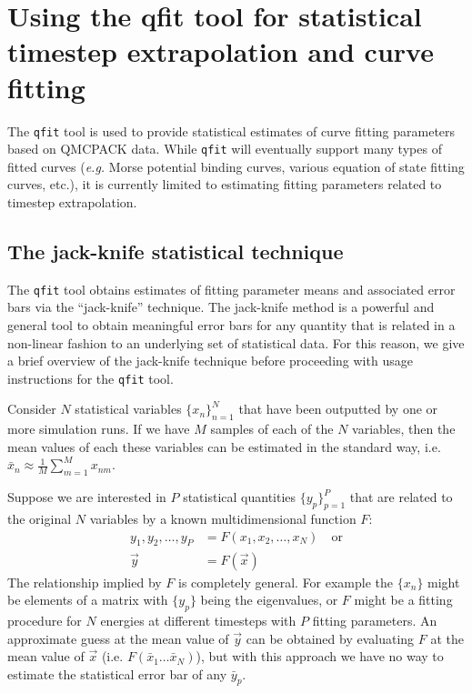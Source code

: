 \section{Using the qfit tool for statistical timestep extrapolation and curve fitting}
\label{sec:qfit}

The \texttt{qfit} tool is used to provide statistical estimates of
curve fitting parameters based on QMCPACK data.  While \texttt{qfit}
will eventually support many types of fitted curves (\emph{e.g.} Morse
potential binding curves, various equation of state fitting curves, etc.),
it is currently limited to estimating fitting parameters related to
timestep extrapolation.

\subsection{The jack-knife statistical technique}
The \texttt{qfit} tool obtains estimates of fitting parameter
means and associated error bars via the ``jack-knife''
technique.  The jack-knife method is a powerful and general tool
to obtain meaningful error bars for any quantity that is related
in a non-linear fashion to an underlying set of statistical data.
For this reason, we give a brief overview of the jack-knife
technique before proceeding with usage instructions for the
\texttt{qfit} tool.

Consider $N$ statistical variables $\{x_n\}_{n=1}^N$ that have
been outputted by one or more simulation runs.  If we have
$M$ samples of each of the $N$ variables, then the mean values
of each these variables can be estimated in the standard way,
i.e. $\bar{x}_n\approx \tfrac{1}{M}\sum_{m=1}^Mx_{nm}$.

Suppose we are interested in $P$ statistical quantities
$\{y_p\}_{p=1}^P$ that are related to the original $N$ variables
by a known multidimensional function $F$:
\begin{align}
  y_1,y_2,\ldots,y_P &= F(x_1,x_2,\ldots,x_N)\quad \textrm{or} \nonumber \\
  \vec{y} &= F(\vec{x})
\end{align}
The relationship implied by $F$ is completely general. 
For example the $\{x_n\}$ might be elements of a matrix
with $\{y_p\}$ being the eigenvalues, or $F$ might be
a fitting procedure for $N$ energies at different timesteps
with $P$ fitting parameters.  An approximate guess at the mean
value of $\vec{y}$ can be obtained by evaluating $F$ at the mean
value of $\vec{x}$ (i.e. $F(\bar{x}_1\ldots\bar{x}_N)$), but with
this approach we have no way to estimate the statistical error 
bar of any $\bar{y}_p$.

